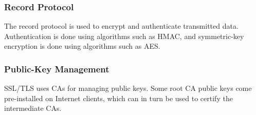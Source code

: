 \documentclass[12pt,titlepage]{article}
\begin{document}
      \subsubsection{Record Protocol}
        The record protocol is used to encrypt and authenticate transmitted data. Authentication is done using algorithms such
        as HMAC, and symmetric-key encryption is done using algorithms such as AES.

      \subsubsection{Public-Key Management}
        SSL/TLS uses CAs for managing public keys. Some root CA public keys come pre-installed on Internet clients, which can
        in turn be used to certify the intermediate CAs.
\end{document}
